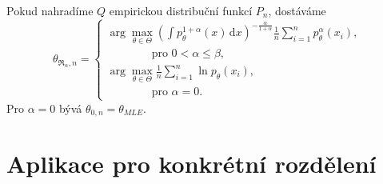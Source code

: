 \documentclass[11pt,a4paper]{beamer}
\newcommand{\intpa}{\int p_\theta^{1+\alpha}(x) \, \mathrm{d}x }
\newcommand{\fn}{\frac{1}{n} \sum_{i=1}^n p_{\theta}^{\alpha}\left( x_i \right)}
\newcommand{\fln}{\frac{1}{n} \sum_{i=1}^n \ln p_{\theta}\left( x_i \right)}
\newcommand{\amtiT}{\arg \max_{\theta \in \Theta}}
\begin{document}

\begin{frame}
Pokud nahradíme $Q$ empirickou distribuční funkcí $P_n$, dostáváme 
\begin{equation*}
	\theta_{\mathfrak{R}_\alpha,n} = 
	\begin{cases}
		\displaystyle{ \amtiT \left( \intpa \right)^{-\frac{\alpha}{1+\alpha}} \fn }, \\
		\qquad \qquad \text{pro } 0 < \alpha \leq \beta, \\
		\displaystyle{ \amtiT  \fln },\\
		\qquad \qquad \text{pro } \alpha = 0.
	\end{cases}	
\end{equation*}
	Pro $\alpha = 0 $ bývá $\theta_{0,n} = \theta_{MLE}.$
\end{frame}

\section{Aplikace pro konkrétní rozdělení}
\end{document}
